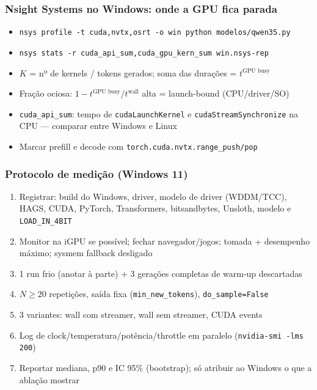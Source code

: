 \documentclass[11pt, aspectratio=169, usepdftitle=false]{beamer}
\begin{document}
\begin{frame}
\frametitle{Nsight Systems no Windows: onde a GPU fica parada}
\begin{itemize}
\item \texttt{nsys profile -t cuda,nvtx,osrt -o win python modelos/qwen35.py}
\item \texttt{nsys stats -r cuda\_api\_sum,cuda\_gpu\_kern\_sum win.nsys-rep}
\item $K$ = nº de kernels / tokens gerados; soma das durações = $t^{\text{GPU busy}}$
\item Fração ociosa: $1 - t^{\text{GPU busy}} / t^{\text{wall}}$ \so alta = launch-bound (CPU/driver/SO)
\item \texttt{cuda\_api\_sum}: tempo de \texttt{cudaLaunchKernel} e \texttt{cudaStreamSynchronize} na CPU --- comparar entre Windows e Linux
\item Marcar prefill e decode com \texttt{torch.cuda.nvtx.range\_push/pop}
\end{itemize}
\end{frame}

\begin{frame}
\end{frame}

\begin{frame}
\frametitle{Protocolo de medição (Windows 11)}
\begin{enumerate}
\item Registrar: build do Windows, driver, modelo de driver (WDDM/TCC), HAGS, CUDA, PyTorch, Transformers, bitsandbytes, Unsloth, modelo e \texttt{LOAD\_IN\_4BIT}
\item Monitor na iGPU se possível; fechar navegador/jogos; tomada + desempenho máximo; sysmem fallback desligado
\item 1 run frio (anotar à parte) + 3 gerações completas de warm-up descartadas
\item $N \ge 20$ repetições, saída fixa (\texttt{min\_new\_tokens}), \texttt{do\_sample=False}
\item 3 variantes: wall com streamer, wall sem streamer, CUDA events
\item Log de clock/temperatura/potência/throttle em paralelo (\texttt{nvidia-smi -lms 200})
\item Reportar mediana, p90 e IC 95\% (bootstrap); só atribuir ao Windows o que a ablação mostrar
\end{enumerate}
\end{frame}
\end{document}
